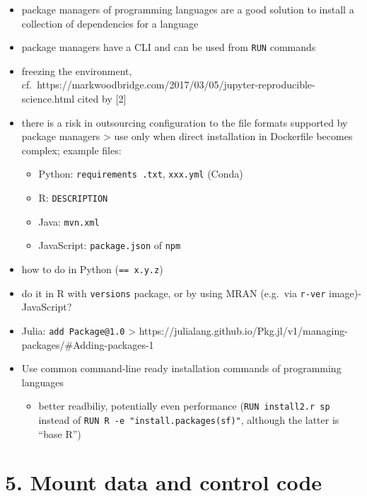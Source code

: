 \documentclass[10pt,letterpaper]{article}
\providecommand{\tightlist}{%
  \setlength{\itemsep}{0pt}\setlength{\parskip}{0pt}}
\begin{document}
\begin{itemize}
\tightlist
\item
  package managers of programming languages are a good solution to
  install a collection of dependencies for a language
\item
  package managers have a CLI and can be used from \texttt{RUN} commands
\item
  freezing the environment,
  cf.~https://markwoodbridge.com/2017/03/05/jupyter-reproducible-science.html
  cited by {[}2{]}
\item
  there is a risk in outsourcing configuration to the file formats
  supported by package managers \textgreater{} use only when direct
  installation in Dockerfile becomes complex; example files:

  \begin{itemize}
  \tightlist
  \item
    Python: \texttt{requirements\ .txt}, \texttt{xxx.yml} (Conda)
  \item
    R: \texttt{DESCRIPTION}
  \item
    Java: \texttt{mvn.xml}
  \item
    JavaScript: \texttt{package.json} of \texttt{npm}
  \end{itemize}
\item
  how to do in Python (\texttt{==\ x.y.z})
\item
  do it in R with \texttt{versions} package, or by using MRAN (e.g.~via
  \texttt{r-ver} image)- JavaScript?
\item
  Julia: \texttt{add\ Package@1.0} \textgreater{}
  https://julialang.github.io/Pkg.jl/v1/managing-packages/\#Adding-packages-1
\item
  Use common command-line ready installation commands of programming
  languages

  \begin{itemize}
  \tightlist
  \item
    better readbiliy, potentially even performance
    (\texttt{RUN\ install2.r\ sp} instead of
    \texttt{RUN\ R\ -e\ "install.packages(\textquotesingle{}sf\textquotesingle{})"},
    although the latter is ``base R'')
  \end{itemize}
\end{itemize}

\hypertarget{mount-data-and-control-code}{%
\section*{5. Mount data and control
code}\label{mount-data-and-control-code}}
\end{document}
